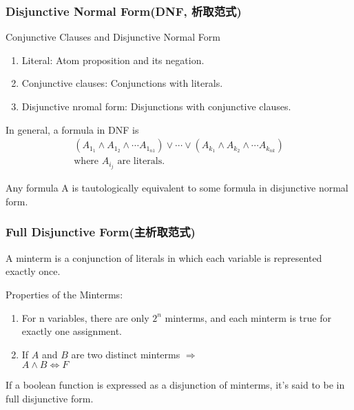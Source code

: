 \subsubsection{Disjunctive Normal Form(DNF, 析取范式)}
\begin{definition}
    Conjunctive Clauses and Disjunctive Normal Form
    \begin{enumerate}
        \item \textcolor{light_red}{Literal}: Atom proposition and its negation. 
        \item \textcolor{light_red}{Conjunctive clauses}: Conjunctions with literals.
        \item \textcolor{light_red}{Disjunctive nromal form}: Disjunctions with conjunctive clauses. 
    \end{enumerate}
\end{definition}

In general, a formula in DNF is 
\begin{align*}
    (A_{1_1}\land A_{1_2}\land\cdots A_{1_{n1}})\lor \cdots \lor (A_{k_1}\land A_{k_2}\land\cdots A_{k_{nk}})\\
    \text{where $A_{i_j}$ are literals.} 
\end{align*}

\begin{theorem}
    Any formula A is tautologically equivalent to some formula in disjunctive normal form. 
\end{theorem}

\subsubsection{Full Disjunctive Form(主析取范式)}
\begin{definition}
    A \textcolor{light_red}{minterm} is a conjunction of literals in which each variable is represented exactly once. 
\end{definition}

Properties of the Minterms:
\begin{enumerate}
    \item For n variables, there are only $2^n$ minterms, and each minterm is true for exactly one assignment. 
    \item If $A$ and $B$ are two distinct minterms $\Longrightarrow$\\
    $ A\land B\Longleftrightarrow F$
\end{enumerate}

\begin{definition}
    If a boolean function is expressed as a disjunction of minterms, it's said to be in \textcolor{light_red}{full disjunctive form}.
\end{definition}

